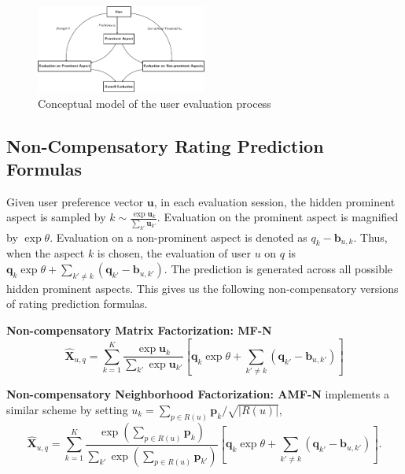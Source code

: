 \documentclass[letterpaper]{article} %
\begin{document}
 \begin{figure}[htbp]
\begin{center}
\includegraphics[width=0.5\textwidth]{conceptualmodel.pdf}
\caption{Conceptual model of the user evaluation process}
\label{fig:model}
\end{center}
\end{figure}


\subsection{Non-Compensatory Rating Prediction Formulas}
Given user preference vector $\mathbf{u}$, in each evaluation session, the hidden prominent aspect is sampled by $k\sim \frac{\exp \mathbf{u}_k}{\sum_{k'} \mathbf{u}_{k'}} $. Evaluation on the prominent aspect is magnified by  $\exp \theta$. Evaluation on a non-prominent aspect is denoted as $q_k-\mathbf{b}_{u,k}$. Thus, when the aspect $k$ is chosen, the evaluation of user $u$ on $q$ is $\mathbf{q}_k \exp\theta  + \sum_{k'\neq k} (\mathbf{q}_{k'}-\mathbf{b}_{u,k'})$. The prediction is generated across all possible hidden prominent aspects. This gives us the following non-compensatory versions of rating prediction formulas.

\textbf{Non-compensatory Matrix Factorization: MF-N} 
\begin{equation}\label{equ:MF-N}
 \hat{\mathbf{X}}_{u,q}=\sum_{k=1}^{K} \frac{\exp \mathbf{u}_k}{\sum_{k'} \exp \mathbf{u}_{k'}} [ \mathbf{q}_k  \exp\theta  + \sum_{k'\neq k} (\mathbf{q}_{k'}-\mathbf{b}_{u,k'}) ]
\end{equation}


\textbf{Non-compensatory Neighborhood Factorization: AMF-N} implements a similar scheme by setting $u_k =\sum_{p \in R(u)} \mathbf{p}_k/\sqrt{|R(u)|} $, 
\begin{equation}\label{equ:AMF-N}
 \hat{\mathbf{X}}_{u,q}=\sum_{k=1}^{K} \frac{\exp (\sum_{p \in R(u)} \mathbf{p}_k )}{\sum_{k'} \exp  (\sum_{p \in R(u)} \mathbf{p}_{k'} ) } [  \mathbf{q}_k \exp\theta + \sum_{k'\neq k} (\mathbf{q}_{k'}-\mathbf{b}_{u,k'}) ].
\end{equation}
\end{document}
